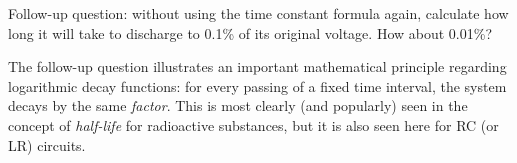 \vskip 10pt

Follow-up question: without using the time constant formula again, calculate how long it will take to discharge to 0.1\% of its original voltage.  How about 0.01\%?







The follow-up question illustrates an important mathematical principle regarding logarithmic decay functions: for every passing of a fixed time interval, the system decays by the same {\it factor}.  This is most clearly (and popularly) seen in the concept of {\it half-life} for radioactive substances, but it is also seen here for RC (or LR) circuits.




